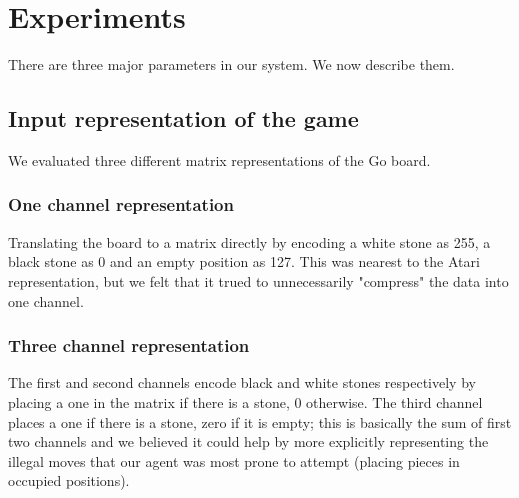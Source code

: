 \section{Experiments}
There are three major parameters in our system. We now describe them.
\subsection{Input representation of the game}
We evaluated three different matrix representations of the Go board.
\subsubsection{One channel representation} Translating the board to a matrix directly by encoding a white stone as 255, a black stone as 0 and an empty position as 127. This was nearest to the Atari representation, but we felt that it trued to unnecessarily "compress" the data into one channel.
\subsubsection{Three channel representation} The first and second channels encode black and white stones respectively by placing a one in the matrix if there is a stone, 0 otherwise. The third channel places a one if there is a stone, zero if it is empty; this is basically the sum of first two channels and we believed it could help by more explicitly representing the illegal moves that our agent was most prone to attempt (placing pieces in occupied positions).
